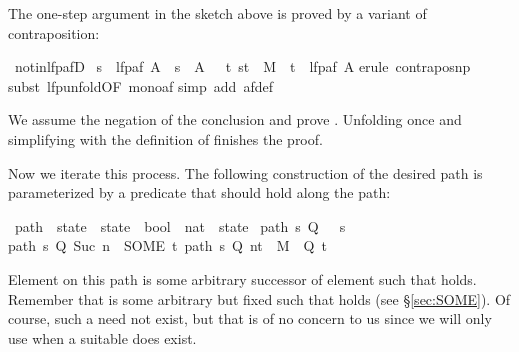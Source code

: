 \begin{isabellebody}
\begin{isamarkuptext}
The one-step argument in the sketch above
is proved by a variant of contraposition:%
\end{isamarkuptext}%
\isamarkuptrue%
\isamarkupfalse%
\ not{\isacharunderscore}in{\isacharunderscore}lfp{\isacharunderscore}afD{\isacharcolon}\isanewline
\ {\isachardoublequoteopen}s\ {\isasymnotin}\ lfp{\isacharparenleft}af\ A{\isacharparenright}\ {\isasymLongrightarrow}\ s\ {\isasymnotin}\ A\ {\isasymand}\ {\isacharparenleft}{\isasymexists}\ t{\isachardot}\ {\isacharparenleft}s{\isacharcomma}t{\isacharparenright}\ {\isasymin}\ M\ {\isasymand}\ t\ {\isasymnotin}\ lfp{\isacharparenleft}af\ A{\isacharparenright}{\isacharparenright}{\isachardoublequoteclose}\isanewline
%
\isadelimproof
%
\endisadelimproof
%
\isatagproof
{}\isamarkupfalse%
{\isacharparenleft}erule\ contrapos{\isacharunderscore}np{\isacharparenright}\isanewline
{}\isamarkupfalse%
{\isacharparenleft}subst\ lfp{\isacharunderscore}unfold{\isacharbrackleft}OF\ mono{\isacharunderscore}af{\isacharbrackright}{\isacharparenright}\isanewline
{}\isamarkupfalse%
{\isacharparenleft}simp\ add{\isacharcolon}\ af{\isacharunderscore}def{\isacharparenright}\isanewline
{}\isamarkupfalse%
%
\endisatagproof
{\isafoldproof}%
%
\isadelimproof
%
\endisadelimproof
%
\begin{isamarkuptext}%
\noindent
We assume the negation of the conclusion and prove .
Unfolding  once and
simplifying with the definition of  finishes the proof.

Now we iterate this process. The following construction of the desired
path is parameterized by a predicate  that should hold along the path:%
\end{isamarkuptext}%
\isamarkuptrue%
\isamarkupfalse%
\ path\ {\isacharcolon}{\isacharcolon}\ {\isachardoublequoteopen}state\ {\isasymRightarrow}\ {\isacharparenleft}state\ {\isasymRightarrow}\ bool{\isacharparenright}\ {\isasymRightarrow}\ {\isacharparenleft}nat\ {\isasymRightarrow}\ state{\isacharparenright}{\isachardoublequoteclose}\ \isanewline
{\isachardoublequoteopen}path\ s\ Q\ {}\ {\isacharequal}\ s{\isachardoublequoteclose}\ {\isacharbar}\isanewline
{\isachardoublequoteopen}path\ s\ Q\ {\isacharparenleft}Suc\ n{\isacharparenright}\ {\isacharequal}\ {\isacharparenleft}SOME\ t{\isachardot}\ {\isacharparenleft}path\ s\ Q\ n{\isacharcomma}t{\isacharparenright}\ {\isasymin}\ M\ {\isasymand}\ Q\ t{\isacharparenright}{\isachardoublequoteclose}%
\begin{isamarkuptext}%
\noindent
Element  on this path is some arbitrary successor
 of element  such that  holds.  Remember that 
is some arbitrary but fixed  such that  holds (see \S\ref{sec:SOME}). Of
course, such a  need not exist, but that is of no
concern to us since we will only use  when a
suitable  does exist.


\end{isamarkuptext}
\end{isabellebody}
